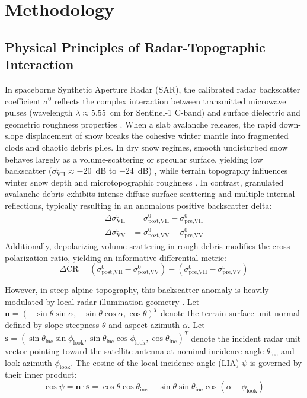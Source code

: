 \section{Methodology}
\label{sec:method}

\subsection{Physical Principles of Radar-Topographic Interaction}
\label{sec:method:physics}

In spaceborne Synthetic Aperture Radar (SAR), the calibrated radar backscatter coefficient $\sigma^0$ reflects the complex interaction between transmitted microwave pulses (wavelength $\lambda \approx 5.55$~cm for Sentinel-1 C-band) and surface dielectric and geometric roughness properties \citep{small2011flattening}. When a slab avalanche releases, the rapid down-slope displacement of snow breaks the cohesive winter mantle into fragmented clods and chaotic debris piles. In dry snow regimes, smooth undisturbed snow behaves largely as a volume-scattering or specular surface, yielding low backscatter ($\sigma^0_{\text{VH}} \approx -20$~dB to $-24$~dB) \citep{tompkin2021backscatter}, while terrain topography influences winter snow depth and microtopographic roughness \citep{veitinger2014large}. In contrast, granulated avalanche debris exhibits intense diffuse surface scattering and multiple internal reflections, typically resulting in an anomalous positive backscatter delta:
\begin{align}
\Delta \sigma^0_{\text{VH}} &= \sigma^0_{\text{post,VH}} - \sigma^0_{\text{pre,VH}} \label{eq:diff_vh} \\
\Delta \sigma^0_{\text{VV}} &= \sigma^0_{\text{post,VV}} - \sigma^0_{\text{pre,VV}} \label{eq:diff_vv}
\end{align}
Additionally, depolarizing volume scattering in rough debris modifies the cross-polarization ratio, yielding an informative differential metric:
\begin{equation}
\Delta \text{CR} = (\sigma^0_{\text{post,VH}} - \sigma^0_{\text{post,VV}}) - (\sigma^0_{\text{pre,VH}} - \sigma^0_{\text{pre,VV}}) \label{eq:diff_cr}
\end{equation}

However, in steep alpine topography, this backscatter anomaly is heavily modulated by local radar illumination geometry \citep{tompkin2021backscatter}. Let $\mathbf{n} = (-\sin \theta \sin \alpha, -\sin \theta \cos \alpha, \cos \theta)^T$ denote the terrain surface unit normal defined by slope steepness $\theta$ and aspect azimuth $\alpha$. Let $\mathbf{s} = (\sin \theta_{\text{inc}} \sin \phi_{\text{look}}, \sin \theta_{\text{inc}} \cos \phi_{\text{look}}, \cos \theta_{\text{inc}})^T$ denote the incident radar unit vector pointing toward the satellite antenna at nominal incidence angle $\theta_{\text{inc}}$ and look azimuth $\phi_{\text{look}}$. The cosine of the local incidence angle (LIA) $\psi$ is governed by their inner product:
\begin{equation}
\cos \psi = \mathbf{n} \cdot \mathbf{s} = \cos \theta \cos \theta_{\text{inc}} - \sin \theta \sin \theta_{\text{inc}} \cos(\alpha - \phi_{\text{look}}) \label{eq:lia_physics}
\end{equation}

